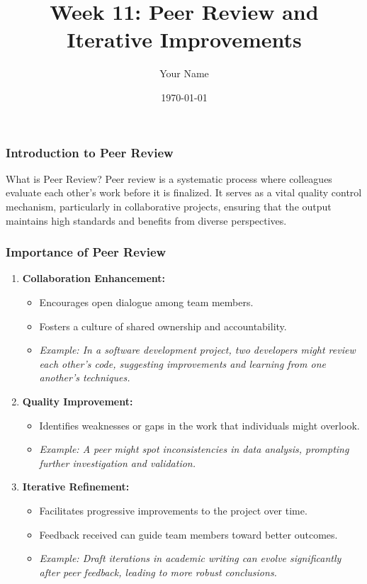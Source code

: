 \documentclass{beamer}
\title{Week 11: Peer Review and Iterative Improvements}
\author{Your Name}
\institute{Your Institution}
\date{\today}
\begin{document}
\frame{\titlepage}

\begin{frame}[fragile]
    \frametitle{Introduction to Peer Review}
    \begin{block}{What is Peer Review?}
        Peer review is a systematic process where colleagues evaluate each other’s work before it is finalized. 
        It serves as a vital quality control mechanism, particularly in collaborative projects, ensuring that the output maintains high standards and benefits from diverse perspectives.
    \end{block}
\end{frame}

\begin{frame}[fragile]
    \frametitle{Importance of Peer Review}
    \begin{enumerate}
        \item \textbf{Collaboration Enhancement:}
            \begin{itemize}
                \item Encourages open dialogue among team members.
                \item Fosters a culture of shared ownership and accountability.
                \item \textit{Example: In a software development project, two developers might review each other’s code, suggesting improvements and learning from one another's techniques.}
            \end{itemize}
        \item \textbf{Quality Improvement:}
            \begin{itemize}
                \item Identifies weaknesses or gaps in the work that individuals might overlook.
                \item \textit{Example: A peer might spot inconsistencies in data analysis, prompting further investigation and validation.}
            \end{itemize}
        \item \textbf{Iterative Refinement:}
            \begin{itemize}
                \item Facilitates progressive improvements to the project over time.
                \item Feedback received can guide team members toward better outcomes.
                \item \textit{Example: Draft iterations in academic writing can evolve significantly after peer feedback, leading to more robust conclusions.}
            \end{itemize}
    \end{enumerate}
\end{frame}
\end{document}
